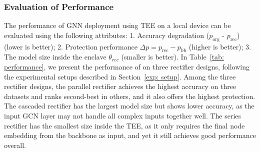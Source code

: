 \begin{table}[t]
\vspace{-3mm}
    \centering
    \caption{Compare various backbone designs}
\vspace{-2mm}
    \label{tab: backbone}
\end{table}

\subsubsection{Evaluation of \mymethod Performance}
\label{exp: performance}
The performance of GNN deployment using TEE on a local device can be evaluated using the following attributes: 1. Accuracy degradation ($p_{\text{org}}$ - $p_{\text{rec}}$) (lower is better); 2. Protection performance $\Delta p = p_{\text{rec}} - p_{\text{bb}}$ (higher is better); 3. The model size inside the enclave $\theta_{rec}$ (smaller is better).
In Table~\ref{tab: performance}, we present the performance of \mymethod on three rectifier designs, following the experimental setups described in Section~\ref{exp: setup}. Among the three rectifier designs, the parallel rectifier achieves %
the highest accuracy on three datasets and ranks second-best in others, and it also offers the highest protection. 
The cascaded rectifier has the largest model size but shows lower accuracy, as the input GCN layer may not handle all complex inputs together well.
The series rectifier has the smallest size inside the TEE, as it only requires the final node embedding from the backbone as input, and yet it still achieves good performance overall. 

